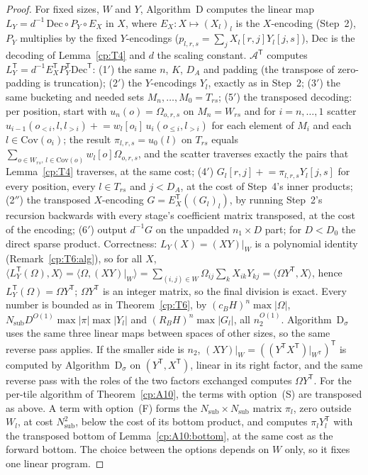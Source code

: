 \documentclass[11pt]{article}
\theoremstyle{definition}
\theoremstyle{remark}
\newcommand{\abs}[1]{\lvert #1\rvert}
\newcommand{\Cov}{\mathrm{Cov}}               %
\newcommand{\cB}{c_B}                         %
\newcommand{\RB}{R_B}                         %
\newcommand{\AlgD}{Algorithm~D}                             %
\begin{document}
\begin{proof}
For fixed sizes, $W$ and $Y$, \AlgD{} computes the linear map $L_Y=d^{-1}\,\mathrm{Dec}\circ P_Y\circ E_X$ in $X$, where $E_X:X\mapsto(X_l)_l$ is the $X$-encoding (Step~2), $P_Y$ multiplies by the fixed $Y$-encodings ($p_{l,r,s}=\sum_jX_l[r,j]Y_l[j,s]$), $\mathrm{Dec}$ is the decoding of Lemma~\ref{cp:T4} and $d$ the scaling constant. $\mathcal A^{\mathsf T}$ computes $L_Y^{\mathsf T}=d^{-1}E_X^{\mathsf T}P_Y^{\mathsf T}\mathrm{Dec}^{\mathsf T}$:
(1$'$) the same $n$, $K$, $D_A$ and padding (the transpose of zero-padding is truncation); (2$'$) the $Y$-encodings $Y_l$, exactly as in Step~2; (3$'$) the same bucketing and needed sets $M_n,\dots,M_0=T_{rs}$; (5$'$) the transposed decoding: per position, start with $u_n(o)=\Omega_{o,r,s}$ on $M_n=W_{rs}$ and for $i=n,\dots,1$ scatter $u_{i-1}(o_{<i},l,l_{>i})\mathrel{+}=w_l[o_i]\,u_i(o_{\le i},l_{>i})$ for each element of $M_i$ and each $l\in\Cov(o_i)$; the result $\pi_{l,r,s}=u_0(l)$ on $T_{rs}$ equals $\sum_{o\in W_{rs},\,l\in\Cov(o)}w_l[o]\Omega_{o,r,s}$, and the scatter traverses exactly the pairs that Lemma~\ref{cp:T4} traverses, at the same cost; (4$'$) $G_l[r,j]\mathrel{+}=\pi_{l,r,s}Y_l[j,s]$ for every position, every $l\in T_{rs}$ and $j<D_A$, at the cost of Step~4's inner products; (2$''$) the transposed $X$-encoding $G=E_X^{\mathsf T}((G_l)_l)$, by running Step~2's recursion backwards with every stage's coefficient matrix transposed, at the cost of the encoding; (6$'$) output $d^{-1}G$ on the unpadded $n_1\times D$ part; for $D<D_0$ the direct sparse product.
Correctness: $L_Y(X)=(XY)|_W$ is a polynomial identity (Remark~\ref{cp:T6:alg}), so for all $X$, $\langle L_Y^{\mathsf T}(\Omega),X\rangle=\langle\Omega,(XY)|_W\rangle=\sum_{(i,j)\in W}\Omega_{ij}\sum_kX_{ik}Y_{kj}=\langle\Omega Y^{\mathsf T},X\rangle$, hence $L_Y^{\mathsf T}(\Omega)=\Omega Y^{\mathsf T}$; $\Omega Y^{\mathsf T}$ is an integer matrix, so the final division is exact. Every number is bounded as in Theorem~\ref{cp:T6}, by $(\cB H)^n\max\abs\Omega$, $N_{\mathrm{sub}}D^{O(1)}\max\abs\pi\max\abs{Y_l}$ and $(\RB H)^n\max\abs{G_l}$, all $n_2^{O(1)}$.
Algorithm~D$_\sigma$ uses the same three linear maps between spaces of other sizes, so the same reverse pass applies. If the smaller side is $n_2$, $(XY)|_W=((Y^{\mathsf T}X^{\mathsf T})|_{W^{\mathsf T}})^{\mathsf T}$ is computed by Algorithm~D$_\sigma$ on $(Y^{\mathsf T},X^{\mathsf T})$, linear in its right factor, and the same reverse pass with the roles of the two factors exchanged computes $\Omega Y^{\mathsf T}$.
For the per-tile algorithm of Theorem~\ref{cp:A10}, the terms with option~(S) are transposed as above. A term with option~(F) forms the $N_{\mathrm{sub}}\times N_{\mathrm{sub}}$ matrix $\pi_l$, zero outside $W_l$, at cost $N_{\mathrm{sub}}^2$, below the cost of its bottom product, and computes $\pi_lY_l^{\mathsf T}$ with the transposed bottom of Lemma~\ref{cp:A10:bottom}, at the same cost as the forward bottom. The choice between the options depends on $W$ only, so it fixes one linear program.
\end{proof}
\end{document}
